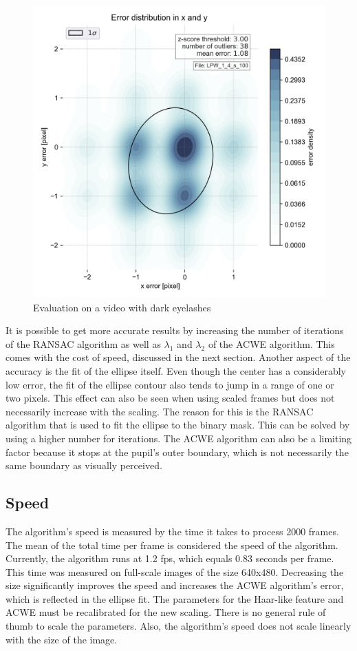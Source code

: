 \begin{figure}[h]
    \centering
    \includegraphics[width=0.9\linewidth]{plots/LPW_1_4_s_100.png} 
\caption{Evaluation on a video with dark eyelashes}
\label{fig:dark_eyelashes_eval}
\end{figure}
\clearpage
It is possible to get more accurate results by increasing the number of iterations of the RANSAC algorithm as well as $\lambda_1$ and $\lambda_2$ of the ACWE algorithm. This comes with the cost of speed, discussed in the next section. 
Another aspect of the accuracy is the fit of the ellipse itself. Even though the center has a considerably low error, the fit of the ellipse contour also tends to jump in a range of one or two pixels. This effect can also be seen when using scaled frames but does not necessarily increase with the scaling. The reason for this is the RANSAC algorithm that is used to fit the ellipse to the binary mask. This can be solved by using a higher number for iterations. The ACWE algorithm can also be a limiting factor because it stops at the pupil's outer boundary, which is not necessarily the same boundary as visually perceived.

\subsection{Speed}
The algorithm's speed is measured by the time it takes to process 2000 frames. The mean of the total time per frame is considered the speed of the algorithm. Currently, the algorithm runs at 1.2 fps, which equals 0.83  seconds per frame. This time was measured on full-scale images of the size 640x480. Decreasing the size significantly improves the speed and increases the ACWE algorithm's error, which is reflected in the ellipse fit. The parameters for the Haar-like feature and ACWE must be recalibrated for the new scaling. There is no general rule of thumb to scale the parameters. Also,  the algorithm's speed does not scale linearly with the size of the image.
